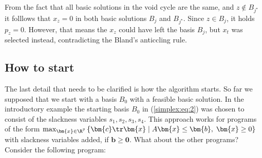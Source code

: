 \begin{dokaz}
\noindent
From the fact that all  basic solutions in the void cycle are the same, and $z\not\in B_{j^\star}$
it folllows that  $x_z=0$  in both basic solutions  $B_j$ and  $B_{j^\star}$. 
Since  $z\in B_j$, it holds $p_z=0$.
However, that means the $x_z$ could have left the basis $B_j$, but $x_t$ was selected instead, contradicting
the Bland's anticcling rule.
\end{dokaz}

\subsection*{How to start}

\noindent
The last detail that needs to be clarified  is how the algorithm starts. So far we supposed that 
we start with a basis $B_0$ with a feasible basic solution. In the introductory example 
the starting basis $B_0$ in (\ref{simplex:eq:2}) was chosen to consist of the slackness variables
$s_1,s_2,s_3,s_4$. This approach works for programs of the form
$\max_{\bm{x}\in\R^7}\left\{ \bm{c}\tr\bm{x} \mid A\bm{x}\le\bm{b},\; \bm{x}\ge0
\right\}$ with slackness variables added, 
 if $\bm{b}\ge\bm{0}$. What about the other programs? Consider the following program:


\renewcommand{\commonii}{%
  \draw (-0.5,0) -- coordinate (x axis mid) (1.5,0);
  \draw (0,-0.2) -- coordinate (y axis mid) (0,1.5);
  \foreach \x in {-0.2,-0.1,...,1.4}
      \draw (\x,1pt) -- (\x,-3pt);
  \draw (1,-3pt) node[anchor=north] {1};

  \foreach \y in {0.2,0.3,...,1.4}
      \draw (1pt,\y) -- (-3pt,\y);
  \draw (-1pt,1) node[anchor=east] {1}; 
  
  \draw (0,-3pt) node[anchor=north east]{$0$};
}


\renewcommand{\axes}{
    \draw
      (0,0,0) -- (1.5,0,0) node[anchor=north east]{$x$}
      (0,0,0) -- (0,1.5,0) node[anchor=north west]{$y$}
      (0,0,0) -- (0,0,1.5) node[anchor=south]{$s$};
}


